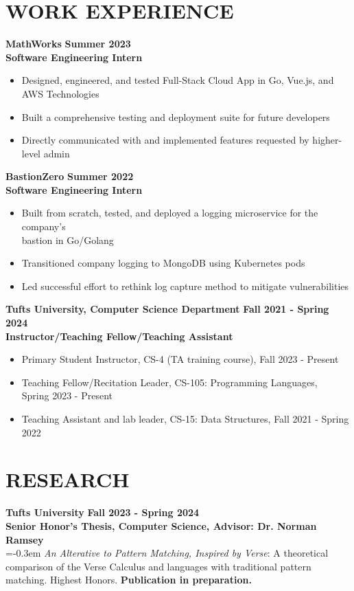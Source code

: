 \documentclass[12pt]{article}
\begin{document}
\section*{WORK EXPERIENCE}
\textbf{MathWorks} \hfill \textbf{Summer 2023} \\
\textbf{Software Engineering Intern}
\begin{itemize}
    \itemsep=-0.3em
    \item Designed, engineered, and tested Full-Stack Cloud App in Go, Vue.js, and \\ AWS Technologies
    \item Built a comprehensive testing and deployment suite for future developers
    \item Directly communicated with and implemented features requested by higher-level admin
\end{itemize}
\textbf{BastionZero} \hfill \textbf{Summer 2022} \\
\textbf{Software Engineering Intern}
\begin{itemize}
    \itemsep=-0.3em
    \item Built from scratch, tested, and deployed a logging microservice for the company's \\
    bastion in Go/Golang
    \item Transitioned company logging to MongoDB using Kubernetes pods
    \item Led successful effort to rethink log capture method to mitigate vulnerabilities
\end{itemize}
\textbf{Tufts University, Computer Science Department} \hfill \textbf{Fall 2021 - Spring 2024}  \\
\textbf{Instructor/Teaching Fellow/Teaching Assistant}
\begin{itemize}
    \itemsep=-0.3em
    \item Primary Student Instructor, CS-4 (TA training course), Fall 2023 - Present 
    \item Teaching Fellow/Recitation Leader, CS-105: Programming Languages, \\ Spring 2023 - Present
    \item Teaching Assistant and lab leader, CS-15: Data Structures, Fall 2021 - Spring 2022
\end{itemize}

\section*{RESEARCH}
\textbf{Tufts University} \hfill \textbf{Fall 2023 - Spring 2024} \\
\textbf{Senior Honor's Thesis, Computer Science, Advisor: Dr. Norman Ramsey} \\
    \itemsep=-0.3em \textit{An Alterative to Pattern Matching, Inspired by
    Verse}: A theoretical comparison of the Verse Calculus and languages with
    traditional pattern matching. Highest Honors. \textbf{Publication in
    preparation.} \\
\end{document}
